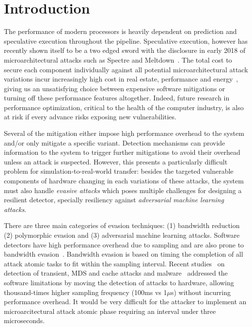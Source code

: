\section{Introduction} 









The performance of modern processors is heavily dependent on prediction and speculative execution throughout the pipeline.  Speculative execution, however has recently shown itself to be a two edged sword with the disclosure in early 2018 of microarchitectural attacks such as Spectre and Meltdown~\cite{spectre, meltdown}. The total cost to secure each component individually against all potential microarchitectural attack variations incur increasingly high cost in real estate, performance and energy~\cite{canella2018systematic, schwarz2019zombieload}, giving us an unsatisfying choice between expensive software mitigations or turning off these performance features altogether.  Indeed, future research in performance optimization, critical to the health of the computer industry, is also at risk if every advance risks exposing new vulnerabilities.


 Several of the mitigation either impose high performance overhead
to the system and/or only mitigate a specific variant. Detection mechanisms can provide information to the system to trigger further
mitigations to avoid their overhead unless an attack is suspected. However, this presents a particularly difficult
problem for simulation-to-real-world transfer: besides 
the
targeted vulnerable components of hardware changing in each variations of these attacks, the
system must also handle {\em evasive attacks} which poses multiple challenges for designing a resilient detector, specially resiliency against {\em adversarial machine learning attacks}.  

There are three main categories of evasion techniques: (1) bandwidth reduction (2) polymorphic evasion and (3) adversarial machine learning attacks. 
Software detectors have high performance overhead due to sampling and are also prone to bandwidth evasion~\cite{Gaudiot2020, PerSpectron}. Bandwidth evasion is based on timing the completion of all attack atomic 
tasks to fit within the sampling interval. Recent studies~\cite{PerSpectron, cyclone2019} on detection of transient, MDS and cache attacks and malware~\cite{Malware2015, ensembleRaid2015,kazdagli-16,RHMD2017} addressed the software limitations by moving the detection of
attacks to hardware, allowing thousand-times higher sampling frequency (100ms vs 1$\mu$s) without incurring performance overhead. It would be very difficult for the attacker to implement an microarcitectural attack atomic phase requiring an interval under three microseconds. 

